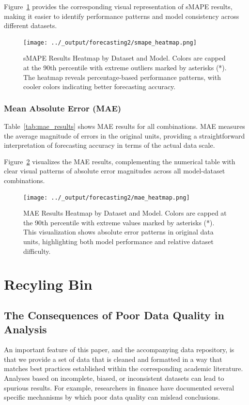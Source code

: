 \documentclass{article}
\begin{document}
\begin{appendices}
Figure~\ref{fig:smape_heatmap} provides the corresponding visual representation of sMAPE results, making it easier to identify performance patterns and model consistency across different datasets.

\begin{figure}[htbp]
\centering
\texttt{[image: ../\_output/forecasting2/smape\_heatmap.png]}
\caption{sMAPE Results Heatmap by Dataset and Model. Colors are capped at the 90th percentile with extreme outliers marked by asterisks (*). The heatmap reveals percentage-based performance patterns, with cooler colors indicating better forecasting accuracy.}
\label{fig:smape_heatmap}
\end{figure}

\subsubsection{Mean Absolute Error (MAE)}

Table~\ref{tab:mae_results} shows MAE results for all combinations. MAE measures the average magnitude of errors in the original units, providing a straightforward interpretation of forecasting accuracy in terms of the actual data scale.



Figure~\ref{fig:mae_heatmap} visualizes the MAE results, complementing the numerical table with clear visual patterns of absolute error magnitudes across all model-dataset combinations.

\begin{figure}[htbp]
\centering
\texttt{[image: ../\_output/forecasting2/mae\_heatmap.png]}
\caption{MAE Results Heatmap by Dataset and Model. Colors are capped at the 90th percentile with extreme values marked by asterisks (*). This visualization shows absolute error patterns in original data units, highlighting both model performance and relative dataset difficulty.}
\label{fig:mae_heatmap}
\end{figure}

\section{Recyling Bin}


\subsection{The Consequences of Poor Data Quality in Analysis}
\label{sec:consequences_of_poor_data_quality}
An important feature of this paper, and the accompanying data repository, is that we provide a set of data that is cleaned and formatted in a way that matches best practices established within the corresponding academic literature. 
Analyses based on incomplete, biased, or inconsistent datasets can lead to spurious results. For example, researchers in finance have documented several specific mechanisms by which poor data quality can mislead conclusions.


\end{appendices}
\end{document}
